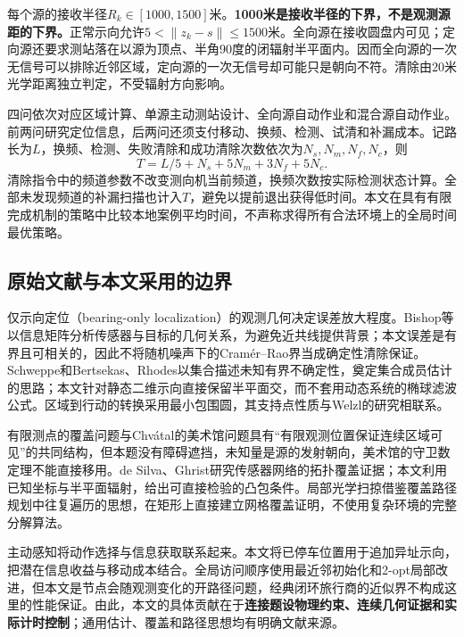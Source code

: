 \documentclass[UTF8,a4paper,zihao=-4,fontset=mac]{ctexart}
\begin{document}
每个源的接收半径$R_k\in[1000,1500]$米。\textbf{1000米是接收半径的下界，不是观测源距的下界。}正常示向允许$5<\|z_k-s\|\le1500$米。全向源在接收圆盘内可见；定向源还要求测站落在以源为顶点、半角90度的闭辐射半平面内。因而全向源的一次无信号可以排除近邻区域，定向源的一次无信号却可能只是朝向不符。清除由20米光学距离独立判定，不受辐射方向影响。

四问依次对应区域计算、单源主动测站设计、全向源自动作业和混合源自动作业。前两问研究定位信息，后两问还须支付移动、换频、检测、试清和补漏成本。记路长为$L$，换频、检测、失败清除和成功清除次数依次为$N_s,N_m,N_f,N_c$，则
\begin{equation}\label{eq:time}
T=L/5+N_s+5N_m+3N_f+5N_c.
\end{equation}
清除指令中的频道参数不改变测向机当前频道，换频次数按实际检测状态计算。全部未发现频道的补漏扫描也计入$T$，避免以提前退出获得低时间。本文在具有有限完成机制的策略中比较本地案例平均时间，不声称求得所有合法环境上的全局时间最优策略。

\subsection{原始文献与本文采用的边界}
仅示向定位（bearing-only localization）的观测几何决定误差放大程度。Bishop等\cite{bishop}以信息矩阵分析传感器与目标的几何关系，为避免近共线提供背景；本文误差是有界且可相关的，因此不将随机噪声下的Cramér--Rao界当成确定性清除保证。Schweppe\cite{schweppe}和Bertsekas、Rhodes\cite{bertsekas}以集合描述未知有界不确定性，奠定集合成员估计的思路；本文针对静态二维示向直接保留半平面交，而不套用动态系统的椭球滤波公式。区域到行动的转换采用最小包围圆，其支持点性质与Welzl\cite{welzl}的研究相联系。

有限测点的覆盖问题与Chvátal\cite{chvatal}的美术馆问题具有“有限观测位置保证连续区域可见”的共同结构，但本题没有障碍遮挡，未知量是源的发射朝向，美术馆的守卫数定理不能直接移用。de Silva、Ghrist\cite{coverage}研究传感器网络的拓扑覆盖证据；本文利用已知坐标与半平面辐射，给出可直接检验的凸包条件。局部光学扫掠借鉴覆盖路径规划中往复遍历的思想\cite{choset}，在矩形上直接建立网格覆盖证明，不使用复杂环境的完整分解算法。

主动感知将动作选择与信息获取联系起来\cite{bajcsy}。本文将已停车位置用于追加异址示向，把潜在信息收益与移动成本结合。全局访问顺序使用最近邻初始化和2-opt局部改进\cite{nn,croes}，但本文是节点会随观测变化的开路径问题，经典闭环旅行商的近似界不构成这里的性能保证。由此，本文的具体贡献在于\textbf{连接题设物理约束、连续几何证据和实际计时控制}；通用估计、覆盖和路径思想均有明确文献来源。
\end{document}
